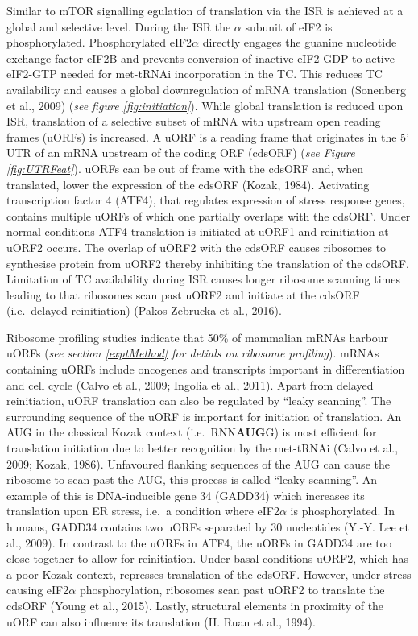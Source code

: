 \documentclass[12pt,openany]{book}
\begin{document}
Similar to mTOR signalling egulation of translation via the ISR is
achieved at a global and selective level. During the ISR the \(\alpha\)
subunit of eIF2 is phosphorylated. Phosphorylated eIF2\(\alpha\)
directly engages the guanine nucleotide exchange factor eIF2B and
prevents conversion of inactive eIF2-GDP to active eIF2-GTP needed for
met-tRNAi incorporation in the TC. This reduces TC availability and
causes a global downregulation of mRNA translation (Sonenberg et al.,
2009) (\emph{see figure \ref{fig:initiation}}). While global translation
is reduced upon ISR, translation of a selective subset of mRNA with
upstream open reading frames (uORFs) is increased. A uORF is a reading
frame that originates in the 5' UTR of an mRNA upstream of the coding
ORF (cdsORF) (\emph{see Figure \ref{fig:UTRFeat}}). uORFs can be out of
frame with the cdsORF and, when translated, lower the expression of the
cdsORF (Kozak, 1984). Activating transcription factor 4 (ATF4), that
regulates expression of stress response genes, contains multiple uORFs
of which one partially overlaps with the cdsORF. Under normal conditions
ATF4 translation is initiated at uORF1 and reinitiation at uORF2 occurs.
The overlap of uORF2 with the cdsORF causes ribosomes to synthesise
protein from uORF2 thereby inhibiting the translation of the cdsORF.
Limitation of TC availability during ISR causes longer ribosome scanning
times leading to that ribosomes scan past uORF2 and initiate at the
cdsORF (i.e.~delayed reinitiation) (Pakos-Zebrucka et al., 2016).

Ribosome profiling studies indicate that 50\% of mammalian mRNAs harbour
uORFs (\emph{see section \ref{exptMethod} for detials on ribosome
profiling}). mRNAs containing uORFs include oncogenes and transcripts
important in differentiation and cell cycle (Calvo et al., 2009; Ingolia
et al., 2011). Apart from delayed reinitiation, uORF translation can
also be regulated by ``leaky scanning''. The surrounding sequence of the
uORF is important for initiation of translation. An AUG in the classical
Kozak context (i.e.~RNN\textbf{AUG}G) is most efficient for translation
initiation due to better recognition by the met-tRNAi (Calvo et al.,
2009; Kozak, 1986). Unfavoured flanking sequences of the AUG can cause
the ribosome to scan past the AUG, this process is called ``leaky
scanning''. An example of this is DNA-inducible gene 34 (GADD34) which
increases its translation upon ER stress, i.e.~a condition where
eIF2\(\alpha\) is phosphorylated. In humans, GADD34 contains two uORFs
separated by 30 nucleotides (Y.-Y. Lee et al., 2009). In contrast to the
uORFs in ATF4, the uORFs in GADD34 are too close together to allow for
reinitiation. Under basal conditions uORF2, which has a poor Kozak
context, represses translation of the cdsORF. However, under stress
causing eIF2\(\alpha\) phosphorylation, ribosomes scan past uORF2 to
translate the cdsORF (Young et al., 2015). Lastly, structural elements
in proximity of the uORF can also influence its translation (H. Ruan et
al., 1994).
\end{document}
